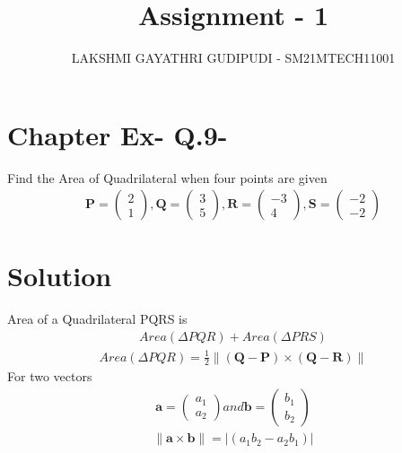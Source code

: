 \documentclass[journal,12pt,twocolumn]{IEEEtran}
\begin{document}
\newcommand{\myvec}[1]{\ensuremath{\begin{pmatrix}#1\end{pmatrix}}}
\newcommand{\cmyvec}[1]{\ensuremath{\begin{pmatrix*}[c]#1\end{pmatrix*}}}
\providecommand{\norm}[1]{\lVert#1\rVert}
\newcommand{\mydet}[1]{\ensuremath{\begin{vmatrix}#1\end{vmatrix}}}
\newcommand{\proj}[2]{\textbf{proj}_{\vec{#1}}\vec{#2}}
\newcommand{\RNum}[1]{\uppercase\expandafter{\romannumeral #1\relax}}
\newcommand{\Rnum}[1]{\lowercase\expandafter{\romannumeral #1\relax}}
\let\StandardTheFigure\thefigure
\let\vec\mathbf

\title{
Assignment - 1
}
\author{ LAKSHMI GAYATHRI GUDIPUDI - SM21MTECH11001}
\maketitle
\newpage
\bigskip
\renewcommand{\thefigure}{\theenumi}

\section*{ Chapter \RNum{2} Ex-\RNum{2} Q.9-\Rnum{2}}
\noindent


Find the Area of Quadrilateral when four points are given
\begin{align}
\vec{P} = \myvec{2\\1}, \vec{Q} =\myvec{3\\5},
\vec{R} =\myvec{-3\\4}, \vec{S} =\myvec{-2\\-2}
\end{align}

\noindent
\section*{\textbf{Solution}}
\noindent

Area of a Quadrilateral PQRS is 
\begin{align}
Area (\Delta PQR)+ Area (\Delta PRS)
\end{align}
\begin{align}
Area (\Delta PQR)=
\frac{1}{2}\norm{(\vec{Q}-\vec{P})\times(\vec{Q}-\vec{R})}
\end{align}
For two vectors
\begin{align}
\vec{a}=\myvec{a_1\\a_2} and \vec{b}=\myvec{b_1\\b_2}
\end{align}
\begin{align}
\norm{\mathbf{\vec{a}\times\vec{b}}}=|(a_1b_2-a_2b_1)|
\end{align}
\end{document}
